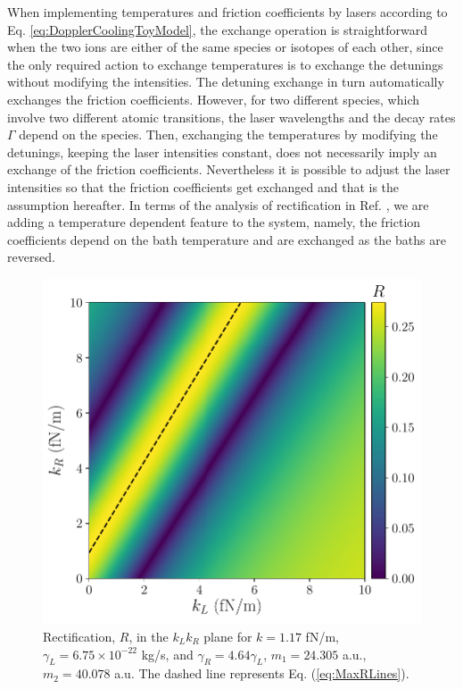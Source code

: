 When implementing temperatures and friction coefficients by lasers according to
Eq. \eqref{eq:DopplerCoolingToyModel}, the exchange operation is straightforward when the two ions are either of the same species or isotopes of each other, since the only required action to exchange temperatures is to exchange the detunings without modifying the intensities. The detuning exchange in turn automatically exchanges the friction coefficients. However, for two different species, which involve two different atomic transitions, the laser wavelengths and the decay rates $\Gamma$ depend on the species. Then, exchanging the temperatures by modifying the detunings, keeping the laser intensities constant, does not necessarily imply an exchange of the friction coefficients. Nevertheless it is possible to adjust the laser intensities so that the friction coefficients get exchanged and that is the assumption hereafter. In terms of the analysis of rectification in Ref. \cite{Pereira2017}, we are adding a temperature dependent feature to the system, namely,  the friction coefficients depend on the bath temperature
and are exchanged as the baths are reversed.

\begin{figure}
  \center
  \includegraphics[width=\linewidth]{Figures/RwMPlota.pdf}
  \caption{Rectification, $R$, in the $k_L k_R$ plane for $k = 1.17$ fN/m, $\gamma_L = 6.75\times 10^{-22}$ kg/s, and $\gamma_R = 4.64\gamma_L$, $m_1 = 24.305$ a.u., $m_2 = 40.078$ a.u. The dashed  line represents Eq.  (\ref{eq:MaxRLines}).}
  \label{fig:Fig_rectification_K_plane}
\end{figure}


